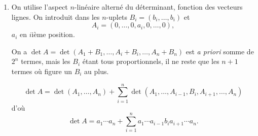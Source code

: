 \begin{enumerate}[label=\arabic*.,leftmargin=2.2em,itemsep=1.2em]
Dans la $r$ième colonne de $A$ on factorise $\binom n{r-1}$, donc
\[
\det A=\prod_{r=1}^{n+1}\binom n{r-1}
\begin{vmatrix}
\alpha_1^0&\alpha_1^1&\cdots&\alpha_1^n\\
\alpha_2^0&\alpha_2^1&\cdots&\alpha_2^n\\
\vdots&\vdots&&\vdots\\
\alpha_{n+1}^0&\alpha_{n+1}^1&\cdots&\alpha_{n+1}^n
\end{vmatrix}
=\prod_{r=1}^{n+1}\binom n{r-1}\prod_{1\le i<j\le n+1}(\alpha_j-\alpha_i),
\]
et
\[
\det B=
\begin{vmatrix}
\beta_1^n&\cdots&\beta_{n+1}^n\\
\beta_1^{n-1}&\cdots&\beta_{n+1}^{n-1}\\
\vdots&&\vdots\\
\beta_1^0&\cdots&\beta_{n+1}^0
\end{vmatrix}
=\prod_{1\le i<j\le n+1}(\beta_i-\beta_j).
\]
(Voir l'exercice 6 pour le calcul de ces déterminants de Van der Monde.)

Comme $\alpha_j-\alpha_i=j-i$ et $\beta_i-\beta_j=i-j$ on a finalement
\[
D=\prod_{k=0}^{n}\binom nk\prod_{1\le i<j\le n+1}-(j-i)^2
=(-1)^{\frac{n(n+1)}2}\prod_{k=0}^{n}(n-k)^{k+1}\binom nk.
\]

\item On utilise l'aspect $n$-linéaire alterné du déterminant, fonction des vecteurs lignes. On introduit dans les $n$-uplets $B_i=(b_i,\ldots,b_i)$ et
\[
A_i=(0,\ldots,0,a_i,0,\ldots,0),
\]
$a_i$ en $i$ième position.

On a $\det A=\det(A_1+B_1,\ldots,A_i+B_i,\ldots,A_n+B_n)$ est \emph{a priori} somme de $2^n$ termes, mais les $B_i$ étant tous proportionnels, il ne reste que les $n+1$ termes où figure un $B_i$ au plus.

\[
\det A=\det(A_1,\ldots,A_n)+\sum_{i=1}^n\det(A_1,\ldots,A_{i-1},B_i,A_{i+1},\ldots,A_n)
\]
d'où
\[
\det A=a_1\cdots a_n+\sum_{i=1}^n a_1\cdots a_{i-1}b_i a_{i+1}\cdots a_n.
\]


\end{enumerate}
